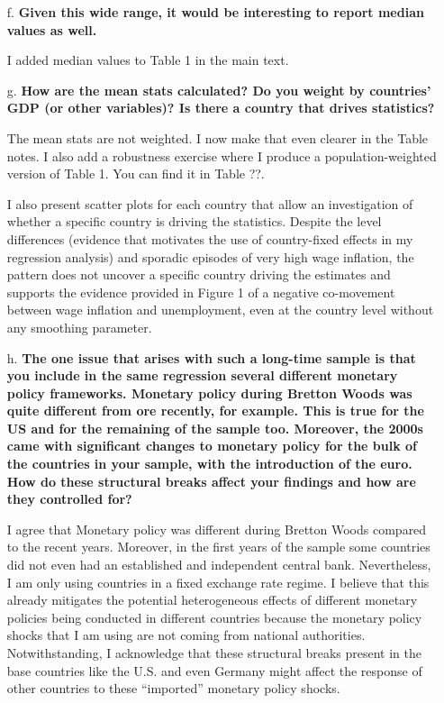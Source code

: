 \documentclass[12pt]{article}
\begin{document}
\begin{enumerate}
\begin{itemize}
    \item[f.] \textbf{Given this wide range, it would be interesting to report median values as well.}

I added median values to Table 1 in the main text.

    \item[g.] \textbf{How are the mean stats calculated? Do you weight by countries' GDP (or other variables)? Is there a country that drives statistics?}

The mean stats are not weighted. I now make that even clearer in the Table notes. I also add a robustness exercise where I produce a population-weighted version of Table 1. You can find it in Table ??.

I also present scatter plots for each country that allow an investigation of whether a specific country is driving the statistics. Despite the level differences (evidence that motivates the use of country-fixed effects in my regression analysis) and sporadic episodes of very high wage inflation, the pattern does not uncover a specific country driving the estimates and supports the evidence provided in Figure 1 of a negative co-movement between wage inflation and unemployment, even at the country level without any smoothing parameter.


    \item[h.] \textbf{The one issue that arises with such a long-time sample is that you include in the same regression several different monetary policy frameworks. Monetary policy during Bretton Woods was quite different from ore recently, for example. This is true for the US and for the remaining of the sample too. Moreover, the 2000s came with significant changes to monetary policy for the bulk of the countries in your sample, with the introduction of the euro. How do these structural breaks affect your findings and how are they controlled for?}

I agree that Monetary policy was different during Bretton Woods compared to the recent years. Moreover, in the first years of the sample some countries did not even had an established and independent central bank. Nevertheless, I am only using countries in a fixed exchange rate regime. I believe that this already mitigates the potential heterogeneous effects of different monetary policies being conducted in different countries because the monetary policy shocks that I am using are not coming from national authorities. Notwithstanding, I acknowledge that these structural breaks present in the base countries like the U.S. and even Germany might affect the response of other countries to these “imported” monetary policy shocks.


\end{itemize}
\end{enumerate}
\end{document}
